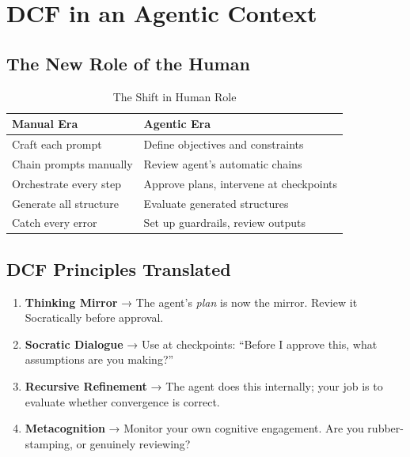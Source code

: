 \chapter{DCF in an Agentic Context}

\section{The New Role of the Human}

\begin{table}[H]
\centering
\begin{tabular}{ll}
\toprule
\textbf{Manual Era} & \textbf{Agentic Era} \\
\midrule
Craft each prompt & Define objectives and constraints \\
Chain prompts manually & Review agent's automatic chains \\
Orchestrate every step & Approve plans, intervene at checkpoints \\
Generate all structure & Evaluate generated structures \\
Catch every error & Set up guardrails, review outputs \\
\bottomrule
\end{tabular}
\caption{The Shift in Human Role}
\end{table}

\section{DCF Principles Translated}

\begin{enumerate}
    \item \textbf{Thinking Mirror} → The agent's \emph{plan} is now the mirror. Review it Socratically before approval.
    \item \textbf{Socratic Dialogue} → Use at checkpoints: ``Before I approve this, what assumptions are you making?''
    \item \textbf{Recursive Refinement} → The agent does this internally; your job is to evaluate whether convergence is correct.
    \item \textbf{Metacognition} → Monitor your own cognitive engagement. Are you rubber-stamping, or genuinely reviewing?
\end{enumerate}

